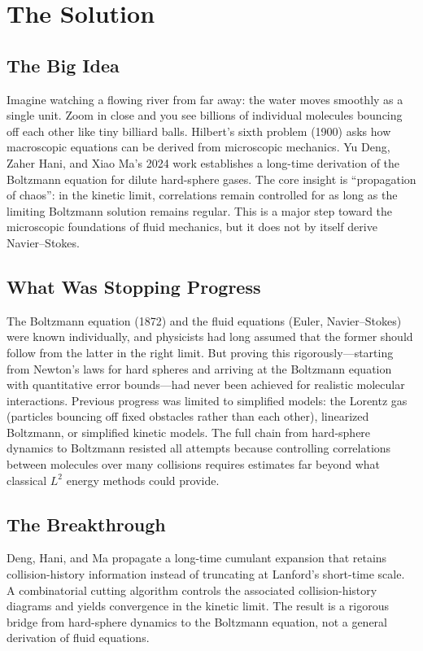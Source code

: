 \section{The Solution}

\subsection{The Big Idea}
Imagine watching a flowing river from far away: the water moves smoothly as a single unit. Zoom in close and you see billions of individual molecules bouncing off each other like tiny billiard balls. Hilbert's sixth problem (1900) asks how macroscopic equations can be derived from microscopic mechanics. Yu Deng, Zaher Hani, and Xiao Ma's 2024 work establishes a long-time derivation of the Boltzmann equation for dilute hard-sphere gases. The core insight is ``propagation of chaos'': in the kinetic limit, correlations remain controlled for as long as the limiting Boltzmann solution remains regular. This is a major step toward the microscopic foundations of fluid mechanics, but it does not by itself derive Navier--Stokes.

\subsection{What Was Stopping Progress}
The Boltzmann equation (1872) and the fluid equations (Euler, Navier--Stokes) were known individually, and physicists had long assumed that the former should follow from the latter in the right limit. But proving this rigorously---starting from Newton's laws for hard spheres and arriving at the Boltzmann equation with quantitative error bounds---had never been achieved for realistic molecular interactions. Previous progress was limited to simplified models: the Lorentz gas (particles bouncing off fixed obstacles rather than each other), linearized Boltzmann, or simplified kinetic models. The full chain from hard-sphere dynamics to Boltzmann resisted all attempts because controlling correlations between molecules over many collisions requires estimates far beyond what classical $L^2$ energy methods could provide.

\subsection{The Breakthrough}
Deng, Hani, and Ma propagate a long-time cumulant expansion that retains collision-history information instead of truncating at Lanford's short-time scale. A combinatorial cutting algorithm controls the associated collision-history diagrams and yields convergence in the kinetic limit. The result is a rigorous bridge from hard-sphere dynamics to the Boltzmann equation, not a general derivation of fluid equations.

